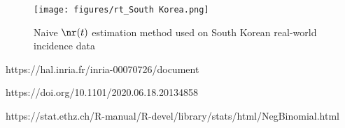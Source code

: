 \documentclass{article}
\begin{document}
\clearpage
\begin{figure}[h!]
    \centering
    \texttt{[image: figures/rt\_South Korea.png]}
    \caption{Naive $\nr(t)$ estimation method used on South Korean real-world incidence data}
    \label{fig:my_label}
\end{figure}



\begin{thebibliography}{1}
https://hal.inria.fr/inria-00070726/document
    
https://doi.org/10.1101/2020.06.18.20134858

https://stat.ethz.ch/R-manual/R-devel/library/stats/html/NegBinomial.html

\end{thebibliography}
\end{document}
